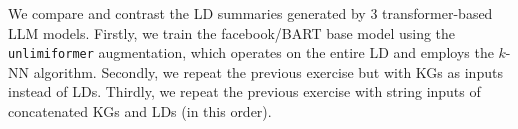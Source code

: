 We compare and contrast the LD summaries generated by 3 transformer-based LLM models. Firstly, we train the facebook/BART base model using the \texttt{unlimiformer} augmentation, which operates on the entire LD and employs the $k$-NN algorithm. Secondly, we repeat the previous exercise but with KGs as inputs instead of LDs. Thirdly, we repeat the previous exercise with string inputs of concatenated KGs and LDs (in this order).
